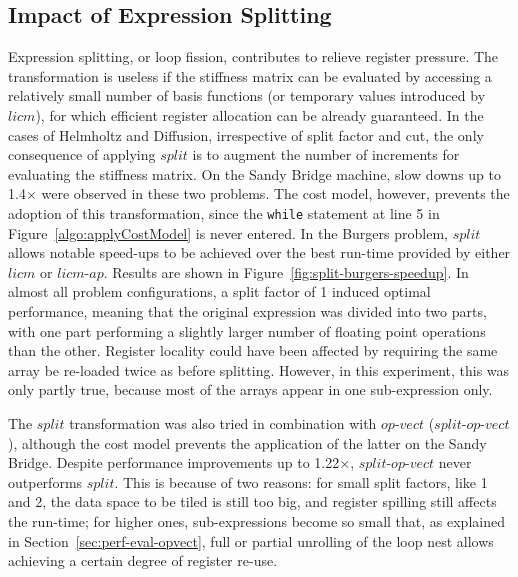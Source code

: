\documentclass[conference]{IEEEtran}
\begin{document}
\subsection{Impact of Expression Splitting}
\label{sec:perf-results-split}
Expression splitting, or loop fission, contributes to relieve register pressure. The transformation is useless if the stiffness matrix can be evaluated by accessing a relatively small number of basis functions (or temporary values introduced by $licm$), for which efficient register allocation can be already guaranteed. In the cases of Helmholtz and Diffusion, irrespective of split factor and cut, the only consequence of applying $split$ is to augment the number of increments for evaluating the stiffness matrix. On the Sandy Bridge machine, slow downs up to 1.4$\times$ were observed in these two problems. The cost model, however, prevents the adoption of this transformation, since the \texttt{while} statement at line 5 in Figure~\ref{algo:applyCostModel} is never entered. In the Burgers problem, $split$ allows notable speed-ups to be achieved over the best run-time provided by either $licm$ or $licm$-$ap$. Results are shown in Figure~\ref{fig:split-burgers-speedup}. In almost all problem configurations, a split factor of 1 induced optimal performance, meaning that the original expression was divided into two parts, with one part performing a slightly larger number of floating point operations than the other. Register locality could have been affected by requiring the same array be re-loaded twice as before splitting. However, in this experiment, this was only partly true, because most of the arrays appear in one sub-expression only. 

The $split$ transformation was also tried in combination with $op$-$vect$ ($split$-$op$-$vect$), although the cost model prevents the application of the latter on the Sandy Bridge. Despite performance improvements up to 1.22$\times$, $split$-$op$-$vect$ never outperforms $split$. This is because of two reasons: for small split factors, like 1 and 2, the data space to be tiled is still too big, and register spilling still affects the run-time; for higher ones, sub-expressions become so small that, as explained in Section~\ref{sec:perf-eval-opvect}, full or partial unrolling of the loop nest allows achieving a certain degree of register re-use.
\end{document}
